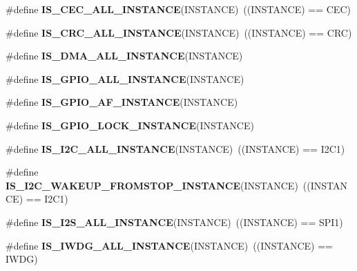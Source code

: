 \begin{DoxyCompactItemize}
\#define {\bfseries I\+S\+\_\+\+C\+E\+C\+\_\+\+A\+L\+L\+\_\+\+I\+N\+S\+T\+A\+N\+CE}(I\+N\+S\+T\+A\+N\+CE)~((I\+N\+S\+T\+A\+N\+CE) == C\+EC)
\item 
\mbox{\label{group___exported__macro_gaa514941a7f02f65eb27450c05e4e8dd1}} 
\#define {\bfseries I\+S\+\_\+\+C\+R\+C\+\_\+\+A\+L\+L\+\_\+\+I\+N\+S\+T\+A\+N\+CE}(I\+N\+S\+T\+A\+N\+CE)~((I\+N\+S\+T\+A\+N\+CE) == C\+RC)
\item 
\#define {\bfseries I\+S\+\_\+\+D\+M\+A\+\_\+\+A\+L\+L\+\_\+\+I\+N\+S\+T\+A\+N\+CE}(I\+N\+S\+T\+A\+N\+CE)
\item 
\#define {\bfseries I\+S\+\_\+\+G\+P\+I\+O\+\_\+\+A\+L\+L\+\_\+\+I\+N\+S\+T\+A\+N\+CE}(I\+N\+S\+T\+A\+N\+CE)
\item 
\#define {\bfseries I\+S\+\_\+\+G\+P\+I\+O\+\_\+\+A\+F\+\_\+\+I\+N\+S\+T\+A\+N\+CE}(I\+N\+S\+T\+A\+N\+CE)
\item 
\#define {\bfseries I\+S\+\_\+\+G\+P\+I\+O\+\_\+\+L\+O\+C\+K\+\_\+\+I\+N\+S\+T\+A\+N\+CE}(I\+N\+S\+T\+A\+N\+CE)
\item 
\mbox{\label{group___exported__macro_gacdf0149a4e8c41a6814c13613c38a6b2}} 
\#define {\bfseries I\+S\+\_\+\+I2\+C\+\_\+\+A\+L\+L\+\_\+\+I\+N\+S\+T\+A\+N\+CE}(I\+N\+S\+T\+A\+N\+CE)~((I\+N\+S\+T\+A\+N\+CE) == I2\+C1)
\item 
\mbox{\label{group___exported__macro_gadf692bda16bac3264bccff7f59ddaab9}} 
\#define {\bfseries I\+S\+\_\+\+I2\+C\+\_\+\+W\+A\+K\+E\+U\+P\+\_\+\+F\+R\+O\+M\+S\+T\+O\+P\+\_\+\+I\+N\+S\+T\+A\+N\+CE}(I\+N\+S\+T\+A\+N\+CE)~((I\+N\+S\+T\+A\+N\+CE) == I2\+C1)
\item 
\mbox{\label{group___exported__macro_ga0b35685911e3c7a38ee89e5cdc5a82fa}} 
\#define {\bfseries I\+S\+\_\+\+I2\+S\+\_\+\+A\+L\+L\+\_\+\+I\+N\+S\+T\+A\+N\+CE}(I\+N\+S\+T\+A\+N\+CE)~((I\+N\+S\+T\+A\+N\+CE) == S\+P\+I1)
\item 
\mbox{\label{group___exported__macro_gad9ec4c52f0572ee67d043e006f1d5e39}} 
\#define {\bfseries I\+S\+\_\+\+I\+W\+D\+G\+\_\+\+A\+L\+L\+\_\+\+I\+N\+S\+T\+A\+N\+CE}(I\+N\+S\+T\+A\+N\+CE)~((I\+N\+S\+T\+A\+N\+CE) == I\+W\+DG)
\item 
\mbox{\label{group___exported__macro_gab4230e8bd4d88adc4250f041d67375ce}} 

\end{DoxyCompactItemize}

